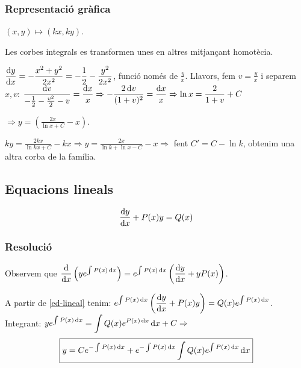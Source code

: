 \subsubsection*{Representació gràfica}
\begin{defi}[Homotècia]
$(x,y) \mapsto (kx, ky)$.
\end{defi}
Les corbes integrals es transformen unes en altres mitjançant homotècia.
\begin{example}
 $\displaystyle \frac{\mathrm{d} y}{\mathrm{d} x} = - \frac{x^{2} + y^{2}}{2x^{2}} = - \frac{1}{2} - \frac{y^{2}}{2x^{2}}$, funció només de $\displaystyle \frac{y}{x}$. Llavors, fem $\displaystyle v = \frac{y}{x}$ i separem $x, v$: $\displaystyle \frac{\mathrm{d} v}{- \frac{1}{2} - \frac{v^{2}}{2} - v} = \frac{\mathrm{d} x}{x} \Rightarrow - \frac{2 \mathop{}\!\mathrm{d} v}{(1+v)^{2}} = \frac{\mathrm{d} x}{x} \Rightarrow \ln x = \frac{2}{1+v} + C$

 $\Rightarrow \boxed{y = \left( \frac{2x}{\ln x + C} - x \right)}$.
\end{example}
\begin{example}
    $\displaystyle ky = \frac{2kx}{\ln kx + C} - kx \Rightarrow \boxed{y = \frac{2x}{\ln k + \ln x - C} - x} \Rightarrow$ fent $C' = C - \ln k$, obtenim una altra corba de la família.
\end{example}
\subsection{Equacions lineals}
\begin{defi}
\begin{align}\label{ed-lineal}
   \frac{\mathrm{d} y}{\mathrm{d} x} + P(x) y = Q(x)
\end{align}
\end{defi}

\subsubsection*{Resolució}
Observem que $\displaystyle \frac{\mathrm{d}}{\mathrm{d} x} \left( y e^{\int P(x) \mathop{}\!\mathrm{d} x} \right) = e^{\int P(x) \mathop{}\!\mathrm{d} x} \left( \frac{\mathrm{d} y}{\mathrm{d} x} + y P(x) \right)$.

A partir de \eqref{ed-lineal} tenim: $\displaystyle e^{\int P(x) \mathop{}\!\mathrm{d} x} \left( \frac{\mathrm{d} y}{\mathrm{d} x} + P(x) y \right) = Q(x) e^{\int P(x) \mathop{}\!\mathrm{d} x}$. Integrant: $\displaystyle y e^{\int P(x) \mathop{}\!\mathrm{d} x} = \int Q(x) e^{P(x) \mathop{}\!\mathrm{d} x} \mathop{}\!\mathrm{d} x + C \Rightarrow$
\begin{align}
    \boxed{y = C e^{-\int P(x) \mathop{}\!\mathrm{d} x} + e^{-\int P(x) \mathop{}\!\mathrm{d} x} \int Q(x) e^{\int P(x) \mathop{}\!\mathrm{d} x} \mathop{}\!\mathrm{d} x}
\end{align}

